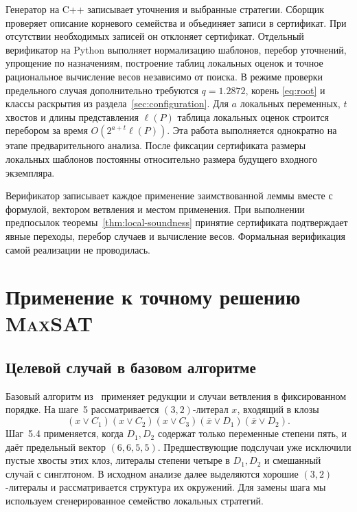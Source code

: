 \documentclass[10pt,twoside]{article}
\newcommand{\MaxSAT}{\textnormal{\textsc{MaxSAT}}}
\theoremstyle{definition}
\theoremstyle{remark}
\begin{document}
Генератор на C++ записывает уточнения и выбранные стратегии. Сборщик
проверяет описание корневого семейства и объединяет записи в сертификат.
При отсутствии необходимых записей он отклоняет сертификат. Отдельный
верификатор на Python выполняет нормализацию шаблонов, перебор уточнений,
упрощение по назначениям, построение таблиц локальных оценок и точное
рациональное вычисление весов независимо от поиска. В режиме проверки
предельного случая дополнительно требуются $q=1.2872$, корень
\eqref{eq:root} и классы раскрытия из раздела~\ref{sec:configuration}.
Для $a$ локальных переменных, $t$ хвостов и длины представления
$\ell(P)$ таблица локальных оценок строится перебором за время
$O(2^{a+t}\ell(P))$. Эта работа выполняется однократно на этапе
предварительного анализа. После фиксации сертификата размеры локальных
шаблонов постоянны относительно размера будущего входного экземпляра.

Верификатор записывает каждое применение заимствованной леммы вместе
с формулой, вектором ветвления и местом применения. При выполнении
предпосылок теоремы~\ref{thm:local-soundness} принятие сертификата
подтверждает явные переходы, перебор случаев и вычисление весов.
Формальная верификация самой реализации не проводилась.

\section{Применение к точному решению \texorpdfstring{\MaxSAT{}}{MaxSAT}}
\label{sec:global}

\subsection{Целевой случай в базовом алгоритме}
\label{sec:bottleneck}

Базовый алгоритм из~\cite{Xiao2022} применяет редукции и случаи
ветвления в фиксированном порядке. На шаге~5 рассматривается
$(3,2)$-литерал $x$, входящий в клозы
\begin{equation}
 (x\vee C_1)(x\vee C_2)(x\vee C_3)
 (\bar x\vee D_1)(\bar x\vee D_2).
 \label{eq:neighborhood}
\end{equation}
Шаг~5.4 применяется, когда $D_1,D_2$ содержат только переменные
степени пять, и даёт предельный вектор $(6,6,5,5)$. Предшествующие
подслучаи уже исключили пустые хвосты этих клоз, литералы степени четыре
в $D_1,D_2$ и смешанный случай с синглтоном. В исходном анализе далее
выделяются хорошие $(3,2)$-литералы и рассматривается структура их
окружений. Для замены шага мы используем сгенерированное семейство
локальных стратегий.
\end{document}
